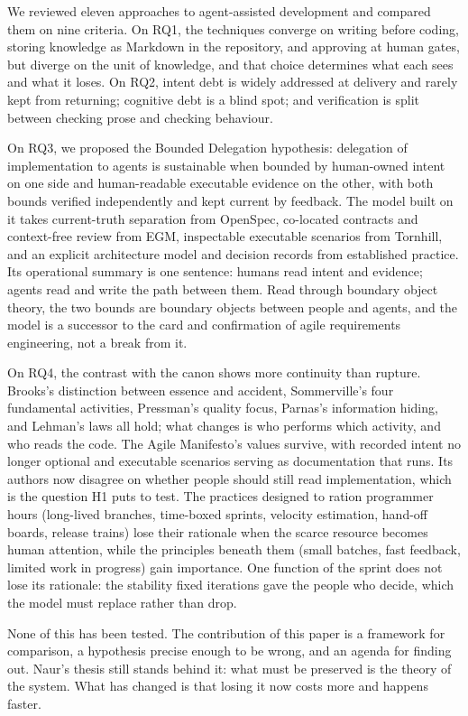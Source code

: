 \documentclass[11pt]{article}
\begin{document}
We reviewed eleven approaches to agent-assisted development and compared them on nine criteria. On RQ1, the techniques converge on writing before coding, storing knowledge as Markdown in the repository, and approving at human gates, but diverge on the unit of knowledge, and that choice determines what each sees and what it loses. On RQ2, intent debt is widely addressed at delivery and rarely kept from returning; cognitive debt is a blind spot; and verification is split between checking prose and checking behaviour.

On RQ3, we proposed the Bounded Delegation hypothesis: delegation of implementation to agents is sustainable when bounded by human-owned intent on one side and human-readable executable evidence on the other, with both bounds verified independently and kept current by feedback. The model built on it takes current-truth separation from OpenSpec, co-located contracts and context-free review from EGM, inspectable executable scenarios from Tornhill, and an explicit architecture model and decision records from established practice. Its operational summary is one sentence: humans read intent and evidence; agents read and write the path between them. Read through boundary object theory, the two bounds are boundary objects between people and agents, and the model is a successor to the card and confirmation of agile requirements engineering, not a break from it.

On RQ4, the contrast with the canon shows more continuity than rupture. Brooks's distinction between essence and accident, Sommerville's four fundamental activities, Pressman's quality focus, Parnas's information hiding, and Lehman's laws all hold; what changes is who performs which activity, and who reads the code. The Agile Manifesto's values survive, with recorded intent no longer optional and executable scenarios serving as documentation that runs. Its authors now disagree on whether people should still read implementation, which is the question H1 puts to test. The practices designed to ration programmer hours (long-lived branches, time-boxed sprints, velocity estimation, hand-off boards, release trains) lose their rationale when the scarce resource becomes human attention, while the principles beneath them (small batches, fast feedback, limited work in progress) gain importance. One function of the sprint does not lose its rationale: the stability fixed iterations gave the people who decide, which the model must replace rather than drop.

None of this has been tested. The contribution of this paper is a framework for comparison, a hypothesis precise enough to be wrong, and an agenda for finding out. Naur's thesis still stands behind it: what must be preserved is the theory of the system. What has changed is that losing it now costs more and happens faster.
\end{document}
